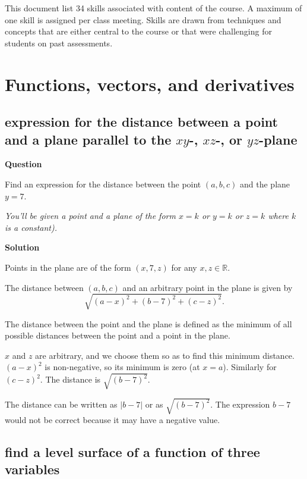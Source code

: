 \documentclass[12pt,letterpaper,noanswers]{exam}
\begin{document}
 \pdfpageheight 11in 
  \pdfpagewidth 8.5in

This document list 34 skills associated with content of the course.  A maximum of one skill is assigned per class meeting.  Skills are drawn from techniques and concepts that are either central to the course or that were challenging for students on past assessments.

\tableofcontents
  
\section{Functions, vectors, and derivatives}

\subsection{expression for the distance between a point and a plane parallel to the $xy$-, $xz$-, or $yz$-plane}

\noindent\textbf{Question}

Find an expression for the distance between the point $(a,b,c)$ and the plane $y = 7.$

\emph{You'll be given a point and a plane of the form $x = k$ or $y = k$ or $z = k$ where $k$ is a constant).}

\noindent\textbf{Solution}

Points in the plane are of the form $(x,7,z)$ for any $x,z\in \mathbb{R}$.  

The distance between $(a,b,c)$ and an arbitrary point in the plane is given by \[\sqrt{(a-x)^2 + (b-7)^2 + (c-z)^2}.\]

The distance between the point and the plane is defined as the minimum of all possible distances between the point and a point in the plane.  

$x$ and $z$ are arbitrary, and we choose them so as to find this minimum distance.  $(a-x)^2$ is non-negative, so its minimum is zero (at $x=a$).  Similarly for $(c-z)^2$.  The distance is $\sqrt{(b-7)^2}$.

The distance can be written as $\vert b-7\vert$ or as $\sqrt{(b-7)^2}$.  The expression $b-7$ would not be correct because it may have a negative value.


\subsection{find a level surface of a function of three variables}
\end{document}
